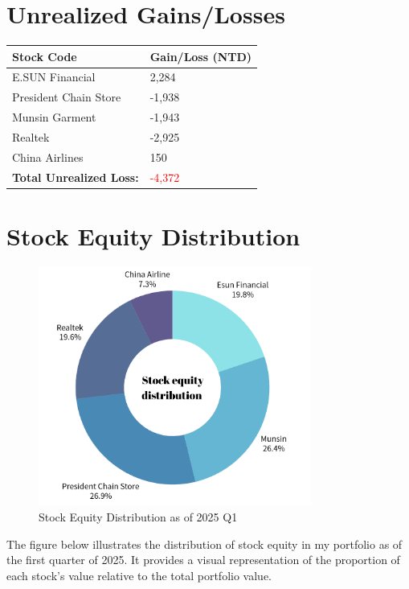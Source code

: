 \documentclass[a4paper,12pt]{article}
\begin{document}
\section{Unrealized Gains/Losses}
\begin{longtable}{ll}
    \toprule
    Stock Code & Gain/Loss (NTD) \\
    \midrule
    E.SUN Financial       & 2,284 \\
    President Chain Store & -1,938 \\
    Munsin Garment        & -1,943 \\
    Realtek               & -2,925 \\
    China Airlines        & 150 \\
    \bottomrule
    \textbf{Total Unrealized Loss:} & \textcolor{red}{-4,372} \\
\end{longtable}

\section{Stock Equity Distribution}
\begin{figure}[h!]
    \centering
    \includegraphics[width=0.8\textwidth]{stock_equity_distribution.png}
    \caption{Stock Equity Distribution as of 2025 Q1}
    \label{fig:stock_equity_distribution}
\end{figure}

\noindent The figure below illustrates the distribution of stock equity in my portfolio as of the first quarter of 2025. It provides a visual representation of the proportion of each stock's value relative to the total portfolio value.
\end{document}
